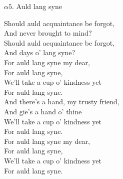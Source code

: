 \documentclass[a6paper,10pt]{article}
\begin{document}
\setlength{\oddsidemargin}{-0.37in}
\begin{center}
\Large{$\alpha5$. Auld lang syne} \\
\end{center}
Should auld acquaintance be forgot, \\
And never brought to mind? \\
Should auld acquaintance be forgot, \\
And days o' lang syne? \\
For auld lang syne my dear, \\
For auld lang syne, \\
We'll take a cup o' kindness yet \\
For auld lang syne. 
\vspace{5pt}\\
And there's a hand, my trusty friend, \\
And gie's a hand o' thine \\
We'll take a cup o' kindness yet \\
For auld lang syne. \\
For auld lang syne my dear, \\
For auld lang syne, \\
We'll take a cup o' kindness yet \\
For auld lang syne. 
\end{document}

